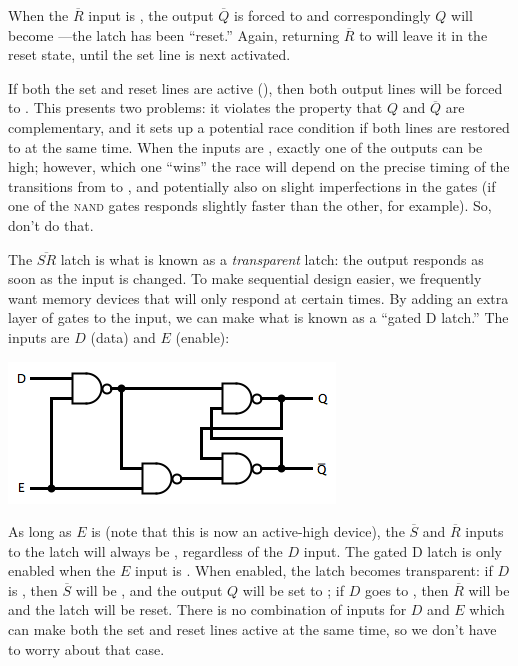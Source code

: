 When the $\overline{R}$ input is \0, the output $\overline{Q}$ is forced to \1 and correspondingly $Q$ will become \0---the latch has been ``reset.'' Again, returning $\overline{R}$ to \1 will leave it in the reset state, until the set line is next activated.

If both the set and reset lines are active (\0), then both output lines will be forced to \1. This presents two problems: it violates the property that $Q$ and $\overline{Q}$ are complementary, and it sets up a potential race condition if both lines are restored to \1 at the same time. When the inputs are \1, exactly one of the outputs can be high; however, which one ``wins'' the race will depend on the precise timing of the transitions from \0 to \1, and potentially also on slight imperfections in the gates (if one of the \textsc{nand} gates responds slightly faster than the other, for example). So, don't do that.

The $\overline{SR}$ latch is what is known as a \textit{transparent} latch: the output responds as soon as the input is changed. To make sequential design easier, we frequently want memory devices that will only respond at certain times. By adding an extra layer of gates to the input, we can make what is known as a ``gated D latch.'' The inputs are $D$ (data) and $E$ (enable):
\begin{center}
\includegraphics[width=!,height=!,scale=0.75]{graphics/DELatch.png}
\end{center}
As long as $E$ is \0 (note that this is now an active-high device), the $\overline{S}$ and $\overline{R}$ inputs to the latch will always be \1, regardless of the $D$ input. The gated D latch is only enabled when the $E$ input is \1. When enabled, the latch becomes transparent: if $D$ is \1, then $\overline{S}$ will be \0, and the output $Q$ will be set to \1; if $D$ goes to \0, then $\overline{R}$ will be \0 and the latch will be reset. There is no combination of inputs for $D$ and $E$ which can make both the set and reset lines active at the same time, so we don't have to worry about that case.

